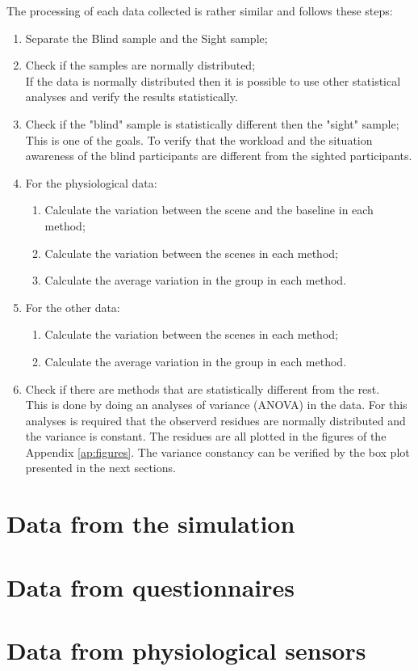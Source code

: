The processing of each data collected is rather similar and follows these steps:
\begin{enumerate}
    \item Separate the Blind sample and the Sight sample;
    \item Check if the samples are normally distributed; \label{itm:results_shapiro} \\
        If the data is normally distributed then it is possible to use other statistical analyses and verify the results statistically.
    \item Check if the "blind" sample is statistically different then the "sight" sample; \label{itm:results_t_test} \\ 
        This is one of the goals. To verify that the workload and the situation awareness of the blind participants are different from the sighted participants.
    \item For the physiological data:
    \begin{enumerate}
        \item Calculate the variation between the scene and the baseline  in each method;
        \item Calculate the variation between the scenes in each method;
        \item Calculate the average variation in the group in each method.
    \end{enumerate}
    \item For the other data:
    \begin{enumerate}
        \item Calculate the variation between the scenes in each method; \label{itm:results_average_method_particpant}
        \item Calculate the average variation in the group in each method.
        \label{itm:results_average_method}
    \end{enumerate}
    \item Check if there are methods that are statistically different from the rest. \\
        This is done by doing an analyses of variance (ANOVA) in the data. For this analyses is required that the observerd residues are normally distributed and the variance is constant. The residues are all plotted in the figures of the Appendix \ref{ap:figures}. The variance constancy can be verified by the box plot presented in the next sections.

\end{enumerate}

\section{Data from the simulation}



\section{Data from questionnaires}



\section{Data from physiological sensors}

 